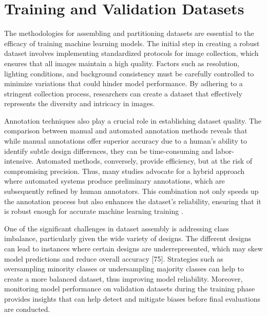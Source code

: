 \section{Training and Validation Datasets}

The methodologies for assembling and partitioning datasets are essential to the efficacy of training machine learning models. The initial step in creating a robust dataset involves implementing standardized protocols for image collection, which ensures that all images maintain a high quality. Factors such as resolution, lighting conditions, and background consistency must be carefully controlled to minimize variations that could hinder model performance. By adhering to a stringent collection process, researchers can create a dataset that effectively represents the diversity and intricacy in images.



Annotation techniques also play a crucial role in establishing dataset quality. The comparison between manual and automated annotation methods reveals that while manual annotations offer superior accuracy due to a human's ability to identify subtle design differences, they can be time-consuming and labor-intensive. Automated methods, conversely, provide efficiency, but at the risk of compromising precision. Thus, many studies advocate for a hybrid approach where automated systems produce preliminary annotations, which are subsequently refined by human annotators. This combination not only speeds up the annotation process but also enhances the dataset's reliability, ensuring that it is robust enough for accurate machine learning training \cite{lee2019hybrid}.



One of the significant challenges in dataset assembly is addressing class imbalance, particularly given the wide variety of designs. The different designs can lead to instances where certain designs are underrepresented, which may skew model predictions and reduce overall accuracy [75]. Strategies such as oversampling minority classes or undersampling majority classes can help to create a more balanced dataset, thus improving model reliability. Moreover, monitoring model performance on validation datasets during the training phase provides insights that can help detect and mitigate biases before final evaluations are conducted.


